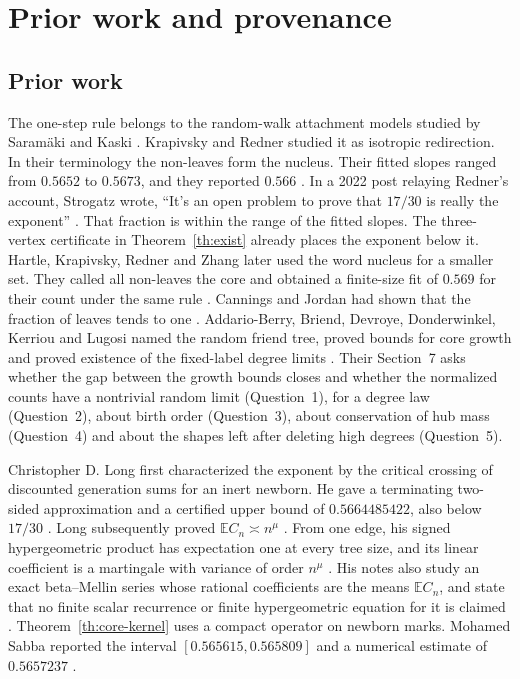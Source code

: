\documentclass[11pt]{article}
\newcommand{\sectag}[1]{\renewcommand{\thesection}{#1}\renewcommand{\theHsection}{#1}}
\theoremstyle{remark}
\numberwithin{equation}{section}
\newcommand{\E}{\mathbb E}
\begin{document}
\sectag{PROV}
\section{Prior work and provenance}\label{sec:provenance}\label{sec:prov}
\subsection{Prior work}
The one-step rule belongs to the random-walk attachment models studied by Saram\"aki and Kaski \cite{SK}. Krapivsky and Redner studied it as isotropic redirection. In their terminology the non-leaves form the nucleus. Their fitted slopes ranged from $0.5652$ to $0.5673$, and they reported $0.566$ \cite[Sec.~5.1]{KR}. In a 2022 post relaying Redner's account, Strogatz wrote, ``It's an open problem to prove that $17/30$ is really the exponent'' \cite{Strogatz}. That fraction is within the range of the fitted slopes. The three-vertex certificate in Theorem~\ref{th:exist} already places the exponent below it. Hartle, Krapivsky, Redner and Zhang later used the word nucleus for a smaller set. They called all non-leaves the core and obtained a finite-size fit of $0.569$ for their count under the same rule \cite[Fig.~6]{HKRZ}. Cannings and Jordan had shown that the fraction of leaves tends to one \cite{CJ}. Addario-Berry, Briend, Devroye, Donderwinkel, Kerriou and Lugosi named the random friend tree, proved bounds for core growth and proved existence of the fixed-label degree limits \cite{AB}. Their Section~7 asks whether the gap between the growth bounds closes and whether the normalized counts have a nontrivial random limit (Question~1), for a degree law (Question~2), about birth order (Question~3), about conservation of hub mass (Question~4) and about the shapes left after deleting high degrees (Question~5).

Christopher D. Long first characterized the exponent by the critical crossing of discounted generation sums for an inert newborn. He gave a terminating two-sided approximation and a certified upper bound of $0.5664485422$, also below $17/30$ \cite{LongKernel}. Long subsequently proved $\E C_n\asymp n^\mu$ \cite{LongMean}. From one edge, his signed hypergeometric product has expectation one at every tree size, and its linear coefficient is a martingale with variance of order $n^\mu$ \cite{LongProduct}. His notes also study an exact beta--Mellin series whose rational coefficients are the means $\E C_n$, and state that no finite scalar recurrence or finite hypergeometric equation for it is claimed \cite{LongRepo}. Theorem~\ref{th:core-kernel} uses a compact operator on newborn marks. Mohamed Sabba reported the interval $[0.565615,0.565809]$ and a numerical estimate of $0.5657237$ \cite{Sabba}.
\end{document}
